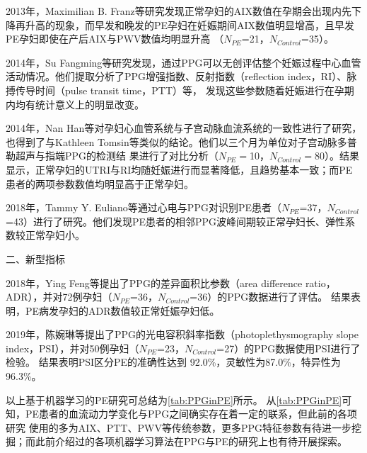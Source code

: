 2013年，Maximilian B. Franz等\cite{Franz2013}研究发现正常孕妇的AIX数值在孕期会出现内先下降再升高的现象，而早发和晚发的PE孕妇在妊娠期间AIX数值明显增高，且早发PE孕妇即使在产后AIX与PWV数值均明显升高
（$N_{PE}$=21，$N_{Control}$=35）。

2014年，Su Fangming等\cite{Su2014}研究发现，通过PPG可以无创评估整个妊娠过程中心血管活动情况。他们提取分析了PPG增强指数、反射指数（reflection index，RI）、脉搏传导时间（pulse transit time，PTT）等，
发现这些参数随着妊娠进行在孕期内均有统计意义上的明显改变。

2014年，Nan Han等\cite{Han2014}对孕妇心血管系统与子宫动脉血流系统的一致性进行了研究，也得到了与Kathleen Tomsin等\cite{Tomsin2012}类似的结论。他们以三个月为单位对子宫动脉多普勒超声与指端PPG的检测结
果进行了对比分析（$N_{PE}=$10，$N_{Control}=$80）。结果显示，正常孕妇的UTRI与RI均随妊娠进行而显著降低，且趋势基本一致；而PE患者的两项参数数值均明显高于正常孕妇。

2018年，Tammy Y. Euliano等\cite{Euliano2018}通过心电与PPG对识别PE患者（$N_{PE}$=37，$N_{Control}$=43）进行了研究。他们发现PE患者的相邻PPG波峰间期较正常孕妇长、弹性系数较正常孕妇小。

二、新型指标

2018年，Ying Feng等\cite{Feng2018}提出了PPG的差异面积比参数（area difference ratio，ADR），并对72例孕妇（$N_{PE}$=36，$N_{Control}$=36）的PPG数据进行了评估。
结果表明，PE病发孕妇的ADR数值较正常妊娠孕妇低。

2019年，陈婉琳等\cite{Chen2019}提出了PPG的光电容积斜率指数（photoplethysmography slope index，PSI），并对50例孕妇（$N_{PE}$=23，$N_{Control}$=27）的PPG数据使用PSI进行了检验。
结果表明PSI区分PE的准确性达到 92.0\%，灵敏性为87.0\%，特异性为96.3\%。

以上基于机器学习的PE研究可总结为\autoref{tab:PPGinPE}所示。
从\autoref{tab:PPGinPE}可知，PE患者的血流动力学变化与PPG之间确实存在着一定的联系，但此前的各项研究
使用的多为AIX、PTT、PWV等传统参数，更多PPG特征参数有待进一步挖掘；而此前介绍过的各项机器学习算法在PPG与PE的研究上也有待开展探索。

